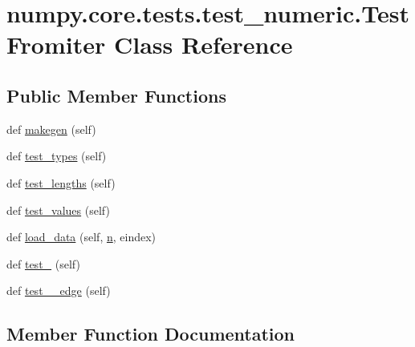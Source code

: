 \hypertarget{classnumpy_1_1core_1_1tests_1_1test__numeric_1_1TestFromiter}{}\section{numpy.\+core.\+tests.\+test\+\_\+numeric.\+Test\+Fromiter Class Reference}
\label{classnumpy_1_1core_1_1tests_1_1test__numeric_1_1TestFromiter}
\subsection*{Public Member Functions}
\begin{DoxyCompactItemize}
\item 
def \hyperlink{classnumpy_1_1core_1_1tests_1_1test__numeric_1_1TestFromiter_acccc637a7fec76c4107b667462e40545}{makegen} (self)
\item 
def \hyperlink{classnumpy_1_1core_1_1tests_1_1test__numeric_1_1TestFromiter_acbef74185345eea9de21956e154f4855}{test\+\_\+types} (self)
\item 
def \hyperlink{classnumpy_1_1core_1_1tests_1_1test__numeric_1_1TestFromiter_af37d3bea2a977516b61c8c9a88a05e29}{test\+\_\+lengths} (self)
\item 
def \hyperlink{classnumpy_1_1core_1_1tests_1_1test__numeric_1_1TestFromiter_a1d67db4e105d36ee26c01e764d3518fb}{test\+\_\+values} (self)
\item 
def \hyperlink{classnumpy_1_1core_1_1tests_1_1test__numeric_1_1TestFromiter_aa8a2dfeff997179677ce3bda3bf95480}{load\+\_\+data} (self, \hyperlink{namespacenumpy_a352663c52853d2754274407d5cae2832}{n}, eindex)
\item 
def \hyperlink{classnumpy_1_1core_1_1tests_1_1test__numeric_1_1TestFromiter_a09e48cc0a9f89c5024b53cbf597b1db8}{test\+\_} (self)
\item 
def \hyperlink{classnumpy_1_1core_1_1tests_1_1test__numeric_1_1TestFromiter_ac8ac60cd51b75ddd0307d629b0b0dfc3}{test\+\_\+\_\+edge} (self)
\end{DoxyCompactItemize}


\subsection{Member Function Documentation}
\mbox{\label{classnumpy_1_1core_1_1tests_1_1test__numeric_1_1TestFromiter_aa8a2dfeff997179677ce3bda3bf95480}} 
